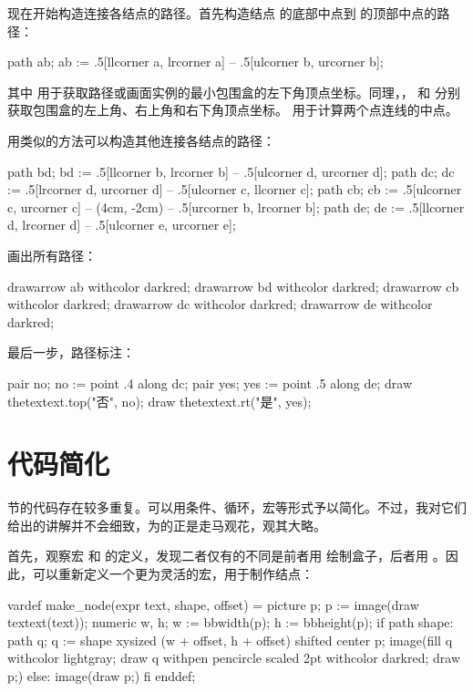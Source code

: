现在开始构造连接各结点的路径。首先构造结点  的底部中点到  的顶部中点的路径：

\starttyping[option=MP]
path ab;
ab := .5[llcorner a, lrcorner a] -- .5[ulcorner b, urcorner b];
\stoptyping

\noindent 其中  用于获取路径或画面实例的最小包围盒的左下角顶点坐标。同理，， 和  分别获取包围盒的左上角、右上角和右下角顶点坐标。 用于计算两个点连线的中点。

用类似的方法可以构造其他连接各结点的路径：

\starttyping[option=MP]
path bd;
bd := .5[llcorner b, lrcorner b] -- .5[ulcorner d, urcorner d];
path dc;
dc := .5[lrcorner d, urcorner d] -- .5[ulcorner c, llcorner c];
path cb;
cb := .5[ulcorner c, urcorner c] -- (4cm, -2cm) -- .5[urcorner b, lrcorner b];
path de;
de := .5[llcorner d, lrcorner d] -- .5[ulcorner e, urcorner e];
\stoptyping

画出所有路径：

\starttyping[option=MP]
drawarrow ab withcolor darkred; drawarrow bd withcolor darkred;
drawarrow cb withcolor darkred; drawarrow dc withcolor darkred;
drawarrow de withcolor darkred;
\stoptyping
{}
\blank

最后一步，路径标注：

\starttyping[option=MP]
pair no;  no  := point .4 along dc;
pair yes; yes := point .5 along de;
draw thetextext.top("否", no);
draw thetextext.rt("是", yes);
\stoptyping
{}

\section{代码简化}

 节的代码存在较多重复。可以用条件、循环，宏等形式予以简化。不过，我对它们给出的讲解并不会细致，为的正是走马观花，观其大略。

首先，观察宏  和  的定义，发现二者仅有的不同是前者用  绘制盒子，后者用 。因此，可以重新定义一个更为灵活的宏，用于制作结点：

\starttyping[option=MP]
vardef make_node(expr text, shape, offset) =
  picture p; p := image(draw textext(text));
  numeric w, h; w := bbwidth(p); h := bbheight(p);
  if path shape:
    path q;
    q := shape xysized (w + offset, h + offset) shifted center p;
    image(fill q withcolor lightgray;
          draw q withpen pencircle scaled 2pt withcolor darkred;
          draw p;)
  else:
    image(draw p;)
  fi
enddef;
\stoptyping

